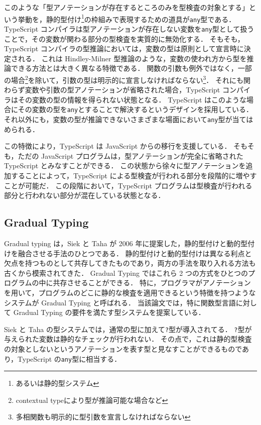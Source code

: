 このような「型アノテーションが存在するところのみを型検査の対象とする」という挙動を，静的型付け\footnote{あるいは静的型システム}の枠組みで表現するための道具が\texttt{any}型である．
TypeScript コンパイラは型アノテーションが存在しない変数を\texttt{any}型として扱うことで，その変数が関わる部分の型検査を実質的に無効化する．
そもそも，TypeScript コンパイラの型推論においては，変数の型は原則として宣言時に決定される．
これは Hindley-Milner 型推論\cite{MILNER1978348}のような，変数の使われ方から型を推論できる方法とは大きく異なる特徴である．
関数の引数も例外ではなく，一部の場合\footnote{contextual typeにより型が推論可能な場合など}を除いて，引数の型は明示的に宣言しなければならない\footnote{多相関数も明示的に型引数を宣言しなければならない}．
それにも関わらず変数や引数の型アノテーションが省略された場合，TypeScript コンパイラはその変数の型の情報を得られない状態となる．
TypeScript はこのような場合にその変数の型を\texttt{any}とすることで解決するというデザインを採用している．
それ以外にも，変数の型が推論できないさまざまな場面において\texttt{any}型が当てはめられる．

この特徴により，TypeScript は JavaScript からの移行を支援している．
そもそも，ただの JavaScript プログラムは，型アノテーションが完全に省略された TypeScript とみなすことができる．
この状態から徐々に型アノテーションを追加することによって，TypeScript による型検査が行われる部分を段階的に増やすことが可能だ．
この段階において，TypeScript プログラムは型検査が行われる部分と行われない部分が混在している状態となる．

\subsection{Gradual Typing}

Gradual typing \cite{GradualTyping}は，Siek と Taha が 2006 年に提案した，静的型付けと動的型付けを融合させる手法のひとつである．
静的型付けと動的型付けは異なる利点と欠点を持つものとして共存してきたものであり，両方の手法を取り入れる方法も古くから模索されてきた．
Gradual Typing ではこれら 2 つの方式をひとつのプログラムの中に共存させることができる．
特に，プログラマがアノテーションを用いて，プログラムのどこに静的な検査を適用できるという特徴を持つようなシステムが Gradual Typing と呼ばれる．
当該論文では，特に関数型言語に対して Gradual Typing の要件を満たす型システムを提案している．

Siek と Taha の型システムでは，通常の型に加えて\texttt{?}型が導入されてる．
\texttt{?}型が与えられた変数は静的なチェックが行われない．
その点で，これは静的型検査の対象としないというアノテーションを表す型と見なすことができるものであり，TypeScript の\texttt{any}型に相当する．

